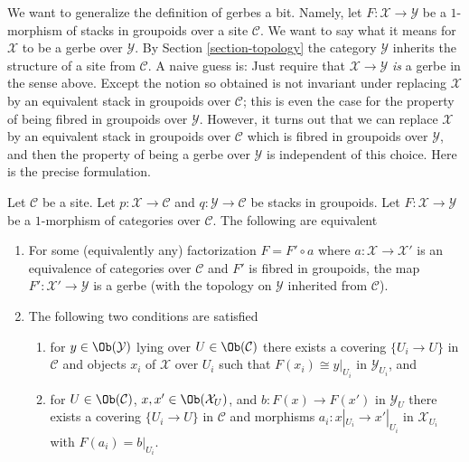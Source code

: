 \noindent
We want to generalize the definition of gerbes a bit. Namely, let
$F : \mathcal{X} \to \mathcal{Y}$ be a $1$-morphism of stacks in groupoids
over a site $\mathcal{C}$. We want to say what it
means for $\mathcal{X}$ to be a gerbe over $\mathcal{Y}$. By
Section \ref{section-topology}
the category $\mathcal{Y}$ inherits the structure of a site from
$\mathcal{C}$. A naive guess is: Just require that
$\mathcal{X} \to \mathcal{Y}$ {\it is} a gerbe in the sense above. Except
the notion so obtained is not invariant under replacing $\mathcal{X}$
by an equivalent stack in groupoids over $\mathcal{C}$; this is even the
case for the property of being fibred in groupoids over $\mathcal{Y}$.
However, it turns out that we can replace $\mathcal{X}$ by an equivalent
stack in groupoids over $\mathcal{C}$ which is fibred in groupoids over
$\mathcal{Y}$, and then the property of being a gerbe over $\mathcal{Y}$
is independent of this choice. Here is the precise formulation.

\begin{lemma}
\label{lemma-when-gerbe}
Let $\mathcal{C}$ be a site. Let $p : \mathcal{X} \to \mathcal{C}$
and $q : \mathcal{Y} \to \mathcal{C}$ be stacks in groupoids.
Let $F : \mathcal{X} \to \mathcal{Y}$ be a $1$-morphism of categories
over $\mathcal{C}$. The following are equivalent
\begin{enumerate}
\item For some (equivalently any) factorization $F = F' \circ a$ where
$a : \mathcal{X} \to \mathcal{X}'$ is an equivalence of categories over
$\mathcal{C}$ and $F'$ is fibred in groupoids, the map
$F' : \mathcal{X}' \to \mathcal{Y}$ is a gerbe (with the topology
on $\mathcal{Y}$ inherited from $\mathcal{C}$).
\item The following two conditions are satisfied
\begin{enumerate}
\item for $y \in \Ob(\mathcal{Y})$ lying over
$U \in \Ob(\mathcal{C})$ there exists a covering
$\{U_i \to U\}$ in $\mathcal{C}$ and objects $x_i$ of $\mathcal{X}$
over $U_i$ such that $F(x_i) \cong y|_{U_i}$ in $\mathcal{Y}_{U_i}$, and
\item for $U \in \Ob(\mathcal{C})$,
$x, x' \in \Ob(\mathcal{X}_U)$, and $b : F(x) \to F(x')$ in
$\mathcal{Y}_U$ there exists
a covering $\{U_i \to U\}$ in $\mathcal{C}$ and morphisms
$a_i : x|_{U_i} \to x'|_{U_i}$ in $\mathcal{X}_{U_i}$ with
$F(a_i) = b|_{U_i}$.
\end{enumerate}
\end{enumerate}
\end{lemma}

